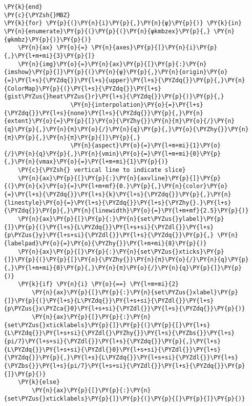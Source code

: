 \begin{Verbatim}[commandchars=\\\{\}]
\PY{k}{end}
\PY{c}{\PYZsh{}MBZ}
\PY{k}{for} \PY{p}{(}\PY{n}{i}\PY{p}{,}\PY{n}{ψ}\PY{p}{)} \PY{k}{in} \PY{n}{enumerate}\PY{p}{(}\PY{p}{(}\PY{n}{ψkmbzex}\PY{p}{,} \PY{n}{ψkmbz}\PY{p}{)}\PY{p}{)}
    \PY{n}{ax} \PY{o}{=} \PY{n}{axes}\PY{p}{[}\PY{n}{i}\PY{p}{,}\PY{l+m+mi}{3}\PY{p}{]}
    \PY{n}{img}\PY{o}{=}\PY{n}{ax}\PY{p}{[}\PY{p}{:}\PY{n}{imshow}\PY{p}{]}\PY{p}{(}\PY{n}{ψ}\PY{p}{,}\PY{n}{origin}\PY{o}{=}\PY{l+s}{\PYZdq{}}\PY{l+s}{upper}\PY{l+s}{\PYZdq{}}\PY{p}{,}\PY{n}{ColorMap}\PY{p}{(}\PY{l+s}{\PYZdq{}}\PY{l+s}{gist\PYZus{}heat\PYZus{}r}\PY{l+s}{\PYZdq{}}\PY{p}{)}\PY{p}{,}
                   \PY{n}{interpolation}\PY{o}{=}\PY{l+s}{\PYZdq{}}\PY{l+s}{none}\PY{l+s}{\PYZdq{}}\PY{p}{,}\PY{n}{extent}\PY{o}{=}\PY{p}{[}\PY{o}{\PYZhy{}}\PY{n}{π}\PY{o}{/}\PY{n}{q}\PY{p}{,}\PY{n}{π}\PY{o}{/}\PY{n}{q}\PY{p}{,}\PY{o}{\PYZhy{}}\PY{n}{π}\PY{p}{,}\PY{n}{π}\PY{p}{]}\PY{p}{,}
                   \PY{n}{aspect}\PY{o}{=}\PY{l+m+mi}{1}\PY{o}{/}\PY{n}{q}\PY{p}{,}\PY{n}{vmin}\PY{o}{=}\PY{l+m+mi}{0}\PY{p}{,}\PY{n}{vmax}\PY{o}{=}\PY{l+m+mi}{1}\PY{p}{)}
    \PY{c}{\PYZsh{} vertical line to indicate slice}
    \PY{n}{ax}\PY{p}{[}\PY{p}{:}\PY{n}{axvline}\PY{p}{]}\PY{p}{(}\PY{n}{x}\PY{o}{=}\PY{l+m+mf}{0.}\PY{p}{,}\PY{n}{color}\PY{o}{=}\PY{l+s}{\PYZdq{}}\PY{l+s}{k}\PY{l+s}{\PYZdq{}}\PY{p}{,}\PY{n}{linestyle}\PY{o}{=}\PY{l+s}{\PYZdq{}}\PY{l+s}{\PYZhy{}.}\PY{l+s}{\PYZdq{}}\PY{p}{,}\PY{n}{linewidth}\PY{o}{=}\PY{l+m+mf}{2.5}\PY{p}{)}
    \PY{n}{ax}\PY{p}{[}\PY{p}{:}\PY{n}{set\PYZus{}ylabel}\PY{p}{]}\PY{p}{(}\PY{l+s}{L\PYZdq{}}\PY{l+s+si}{\PYZdl{}}\PY{l+s}{p\PYZus{}y}\PY{l+s+si}{\PYZdl{}}\PY{l+s}{\PYZdq{}}\PY{p}{,} \PY{n}{labelpad}\PY{o}{=}\PY{o}{\PYZhy{}}\PY{l+m+mi}{8}\PY{p}{)}
    \PY{n}{ax}\PY{p}{[}\PY{p}{:}\PY{n}{set\PYZus{}xticks}\PY{p}{]}\PY{p}{(}\PY{p}{[}\PY{o}{\PYZhy{}}\PY{n}{π}\PY{o}{/}\PY{n}{q}\PY{p}{,}\PY{l+m+mi}{0}\PY{p}{,}\PY{n}{π}\PY{o}{/}\PY{n}{q}\PY{p}{]}\PY{p}{)}
    \PY{k}{if} \PY{n}{i} \PY{o}{==} \PY{l+m+mi}{2}
        \PY{n}{ax}\PY{p}{[}\PY{p}{:}\PY{n}{set\PYZus{}xlabel}\PY{p}{]}\PY{p}{(}\PY{l+s}{L\PYZdq{}}\PY{l+s+si}{\PYZdl{}}\PY{l+s}{p\PYZus{}x\PYZca{}0}\PY{l+s+si}{\PYZdl{}}\PY{l+s}{\PYZdq{}}\PY{p}{)}
        \PY{n}{ax}\PY{p}{[}\PY{p}{:}\PY{n}{set\PYZus{}xticklabels}\PY{p}{]}\PY{p}{(}\PY{p}{[}\PY{l+s}{L\PYZdq{}}\PY{l+s+si}{\PYZdl{}\PYZhy{}}\PY{l+s}{\PYZbs{}}\PY{l+s}{pi/7}\PY{l+s+si}{\PYZdl{}}\PY{l+s}{\PYZdq{}}\PY{p}{,}\PY{l+s}{L\PYZdq{}}\PY{l+s+si}{\PYZdl{}0}\PY{l+s+si}{\PYZdl{}}\PY{l+s}{\PYZdq{}}\PY{p}{,}\PY{l+s}{L\PYZdq{}}\PY{l+s+si}{\PYZdl{}}\PY{l+s}{\PYZbs{}}\PY{l+s}{pi/7}\PY{l+s+si}{\PYZdl{}}\PY{l+s}{\PYZdq{}}\PY{p}{]}\PY{p}{)}
    \PY{k}{else}
        \PY{n}{ax}\PY{p}{[}\PY{p}{:}\PY{n}{set\PYZus{}xticklabels}\PY{p}{]}\PY{p}{(}\PY{p}{[}\PY{p}{]}\PY{p}{)}

\end{Verbatim}
